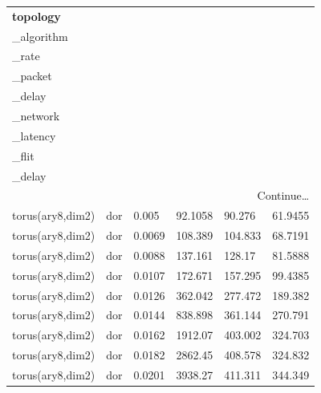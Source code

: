\begin{longtable}[H]{llllll}
\textbf{topology} &
  \textbf{\begin{tabular}[c]{@{}l@{}}routing\\ \_algorithm\end{tabular}} &
  \textbf{\begin{tabular}[c]{@{}l@{}}injection\\ \_rate\end{tabular}} &
  \textbf{\begin{tabular}[c]{@{}l@{}}average\\ \_packet\\ \_delay\end{tabular}} &
  \textbf{\begin{tabular}[c]{@{}l@{}}average\\ \_network\\ \_latency\end{tabular}} &
  \textbf{\begin{tabular}[c]{@{}l@{}}average\\ \_flit\\ \_delay\end{tabular}} \\ \hline
\endhead %
\hline
\multicolumn{6}{r}{Continue…}\\
\endfoot %
\hline
\endlastfoot%
torus(ary8,dim2) & dor        & 0.005                          & 92.1058 & 90.276  & 61.9455 \\
torus(ary8,dim2) & dor        & 0.0069                         & 108.389 & 104.833 & 68.7191 \\
torus(ary8,dim2) & dor        & 0.0088                         & 137.161 & 128.17  & 81.5888 \\
torus(ary8,dim2) & dor        & 0.0107                         & 172.671 & 157.295 & 99.4385 \\
torus(ary8,dim2) & dor        & 0.0126                         & 362.042 & 277.472 & 189.382 \\
torus(ary8,dim2) & dor        & 0.0144                         & 838.898 & 361.144 & 270.791 \\
torus(ary8,dim2) & dor        & 0.0162                         & 1912.07 & 403.002 & 324.703 \\
torus(ary8,dim2) & dor        & 0.0182                         & 2862.45 & 408.578 & 324.832 \\
torus(ary8,dim2) & dor        & 0.0201                         & 3938.27 & 411.311 & 344.349 \\

\end{longtable}
